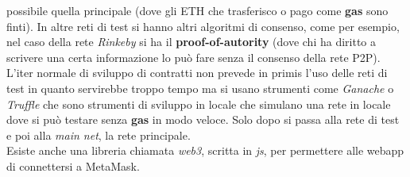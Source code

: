 \documentclass[a4paper,12pt, oneside]{book}
\begin{document}
possibile quella principale (dove gli ETH che trasferisco o pago come
\textbf{gas} sono finti). In altre reti di test si hanno
altri algoritmi di consenso, come per esempio, nel caso della rete
\textit{Rinkeby} si ha il \textbf{proof-of-autority} (dove chi ha diritto a
scrivere una certa informazione lo può fare senza il consenso della rete P2P).\\
L'iter normale di sviluppo di contratti non prevede in primis l'uso delle reti
di test in quanto servirebbe troppo tempo ma si usano strumenti come
\textit{Ganache} o \textit{Truffle} che sono strumenti di sviluppo in locale che
simulano una rete in locale dove si può testare senza \textbf{gas} in modo
veloce. Solo dopo si passa alla rete di test e poi alla \textit{main net}, la
rete principale.\\
Esiste anche una libreria chiamata \textit{web3}, scritta in \textit{js}, per
permettere alle webapp di connettersi a MetaMask.\\
\end{document}
